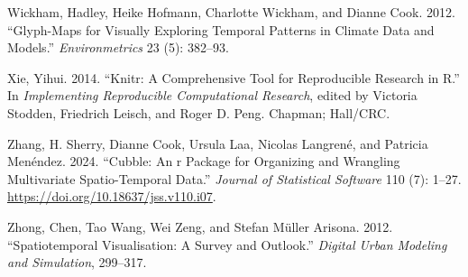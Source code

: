\begin{CSLReferences}{1}{0}
\leavevmode{}%
Wickham, Hadley, Heike Hofmann, Charlotte Wickham, and Dianne Cook. 2012. {``Glyph-Maps for Visually Exploring Temporal Patterns in Climate Data and Models.''} \emph{Environmetrics} 23 (5): 382--93.

\leavevmode{}%
Xie, Yihui. 2014. {``Knitr: A Comprehensive Tool for Reproducible Research in {R}.''} In \emph{Implementing Reproducible Computational Research}, edited by Victoria Stodden, Friedrich Leisch, and Roger D. Peng. Chapman; Hall/CRC.

\leavevmode{}%
Zhang, H. Sherry, Dianne Cook, Ursula Laa, Nicolas Langrené, and Patricia Menéndez. 2024. {``Cubble: An r Package for Organizing and Wrangling Multivariate Spatio-Temporal Data.''} \emph{Journal of Statistical Software} 110 (7): 1--27. \url{https://doi.org/10.18637/jss.v110.i07}.

\leavevmode{}%
Zhong, Chen, Tao Wang, Wei Zeng, and Stefan Müller Arisona. 2012. {``Spatiotemporal Visualisation: A Survey and Outlook.''} \emph{Digital Urban Modeling and Simulation}, 299--317.

\end{CSLReferences}


\address{%
Maliny Po\\
Monash University\\%
Department of Econometrics and Business Statistics\\ Melbourne, Australia\\
%
%
\textit{ORCiD: \href{https://orcid.org/0009-0008-4686-6631}{0009-0008-4686-6631}}\\%
\href{mailto:malinypo12@gmail.com}{\nolinkurl{malinypo12@gmail.com}}%
}

\address{%
S. Nathan Yang\\
Duke University\\%
Durham, North Carolina\\
%
%
\textit{ORCiD: \href{https://orcid.org/0009-0002-9985-1042}{0009-0002-9985-1042}}\\%
\href{mailto:nathan.s.yang@gmail.com}{\nolinkurl{nathan.s.yang@gmail.com}}%
}

\address{%
H. Sherry Zhang\\
University of Texas at Austin\\%
Department of Statistics and Data Sciences\\ Austin, Texas\\
%
%
\textit{ORCiD: \href{https://orcid.org/0000-0002-7122-1463}{0000-0002-7122-1463}}\\%
\href{mailto:huizezhangsh@gmail.com}{\nolinkurl{huizezhangsh@gmail.com}}%
}

\address{%
Dianne Cook\\
Monash University\\%
Department of Econometrics and Business Statistics\\ Melbourne, Australia\\
%
%
\textit{ORCiD: \href{https://orcid.org/0000-0002-3813-7155}{0000-0002-3813-7155}}\\%
\href{mailto:dicook@monash.edu}{\nolinkurl{dicook@monash.edu}}%
}
